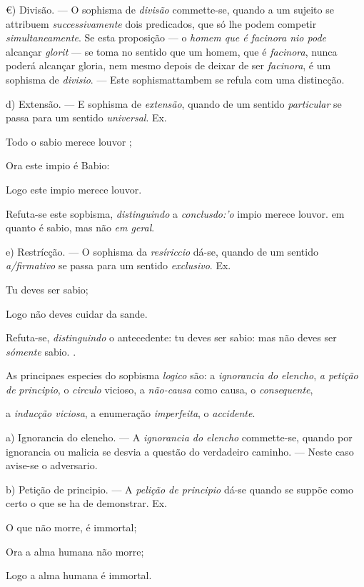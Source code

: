 €) Divisão. --- O sophisma de \emph{divisão} commette-se, quando a um sujeito se attribuem \emph{successivamente} dois predicados, que só lhe podem competir \emph{simultaneamente}. Se esta proposição --- o \emph{homem que é facinora nio pode} alcançar \emph{glorit} --- se toma no sentido que um homem, que é \emph{facinora}, nunca poderá   alcançar gloria, nem mesmo depois de deixar de ser \emph{facinora}, é um sophisma de \emph{divisio}. --- Este sophismattambem se refula com uma distincção.

d) Extensão. --- E sophisma de \emph{extensão}, quando de um sentido \emph{particular} se passa para um sentido \emph{universal}. Ex.

Todo o sabio merece louvor ;

Ora este impio é Babio:

Logo este impio merece louvor.

Refuta-se este sopbisma, \emph{distinguindo} a \emph{conclusdo:'o} impio merece louvor. em quanto é sabio, mas não \emph{em geral}.

e) Restrícção. --- O sophisma da \emph{resíriccio} dá-se, quando de um sentido \emph{a/firmativo} se passa para um sentido \emph{exclusivo}. Ex.

Tu deves ser sabio; \textbar{}

Logo não deves cuidar da sande.

Refuta-se, \emph{distinguindo} o antecedente: tu deves ser sabio: mas não deves ser \emph{sómente} sabio. \textbar{} .


As principaes especies do sopbisma \emph{logico} são: a \emph{ignorancia do elencho}, \emph{a petição de}   \emph{principio}, o \emph{circulo} vicioso, a \emph{não-causa} como causa, o \emph{consequente},

a \emph{inducção viciosa}, a enumeração \emph{imperfeita}, o \emph{accidente}.

a) Ignorancia do eleneho. --- A \emph{ignorancia do elencho} commette-se, quando por ignorancia ou malicia se desvia a questão do verdadeiro caminho. --- Neste caso avise-se o adversario.

b) Petição de principio. --- A \emph{pelição de principio} dá-se quando se suppõe como certo o que se ha de demonstrar. Ex.

O que não morre, é immortal;

Ora a alma humana não morre;

Logo a alma humana é immortal.


